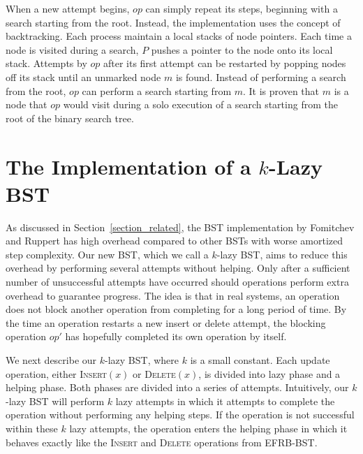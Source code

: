 \documentclass[letterpaper]{article}
\begin{document}
When a new attempt begins, $op$ can simply repeat its steps, beginning with a search starting from the root. Instead, the implementation uses the concept of backtracking. Each process maintain a local stacks of node pointers. Each time a node is visited during a search, $P$ pushes a pointer to the node onto its local stack. Attempts by $op$ after its first attempt can be restarted by popping nodes off its stack until an unmarked node $m$ is found. Instead of performing a search from the root, $op$ can perform a search starting from $m$. It is proven that $m$ is a node that $op$ would visit during a solo execution of a search starting from the root of the binary search tree.


\section{The Implementation of a $k$-Lazy BST}\label{section_implementation}
As discussed in Section~\ref{section_related}, the BST implementation by Fomitchev and Ruppert has high overhead compared to other BSTs with worse amortized step complexity. Our new BST, which we call a $k$-lazy BST, aims to reduce this overhead by performing several attempts without helping. Only after a sufficient number of unsuccessful attempts have occurred should operations perform extra overhead to guarantee progress. The idea is that in real systems, an operation does not block another operation from completing for a long period of time. By the time an operation restarts a new insert or delete attempt, the blocking operation $op'$ has hopefully completed its own operation by itself. 

We next describe our $k$-lazy BST, where $k$ is a small constant. Each update operation, either \textsc{Insert}$(x)$ or \textsc{Delete}$(x)$, is divided into lazy phase and a helping phase. Both phases are divided into a series of attempts. Intuitively, our $k$-lazy BST will perform $k$ lazy attempts in which it attempts to complete the operation without performing any helping steps. If the operation is not successful within these $k$ lazy attempts, the operation enters the helping phase in which it behaves exactly like the \textsc{Insert} and \textsc{Delete} operations from EFRB-BST.
\end{document}
